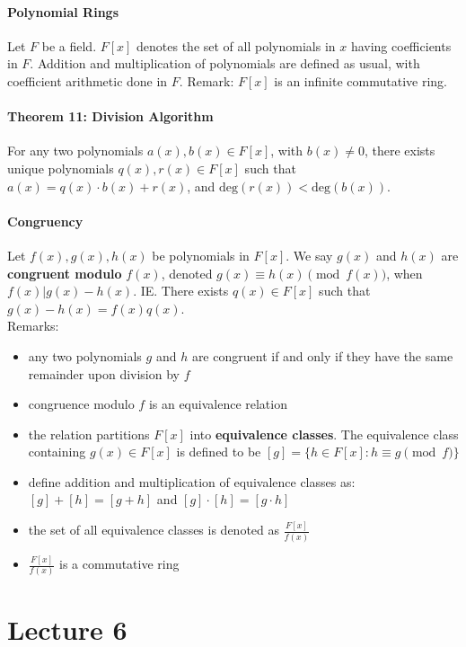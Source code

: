 \documentclass[10pt,letter]{article}
\theoremstyle{plain}
\theoremstyle{definition}
\begin{document}
\paragraph{Polynomial Rings}
Let $F$ be a field. $F[x]$ denotes the set of all polynomials in $x$ having coefficients in $F$. Addition and multiplication of polynomials are defined as usual, with coefficient arithmetic done in $F$. Remark: $F[x]$ is an infinite commutative ring.

\paragraph{Theorem 11: Division Algorithm}
For any two polynomials $a(x),b(x)\in F[x]$, with $b(x)\neq0$, there exists unique polynomials $q(x),r(x)\in F[x]$ such that $a(x)=q(x)\cdot b(x)+r(x)$, and $\text{deg}(r(x))<\text{deg}(b(x))$. \\ 


\paragraph{Congruency}
Let $f(x),g(x),h(x)$ be polynomials in $F[x]$. We say $g(x)$ and $h(x)$  are \textbf{congruent modulo} $f(x)$, denoted $g(x)\equiv h(x)\pmod{f(x)}$, when $f(x)|g(x)-h(x)$. IE. There exists $q(x)\in F[x]$ such that $g(x)-h(x)=f(x)q(x)$. \\ 
Remarks: 
\begin{itemize}
    \item any two polynomials $g$ and $h$ are congruent if and only if they have the same remainder upon division by $f$ 
    \item congruence modulo $f$ is an equivalence relation 
    \item the relation partitions $F[x]$ into \textbf{equivalence classes}. The equivalence class containing $g(x)\in F[x]$ is defined to be $[g]=\{h\in F[x]:h\equiv g\pmod{f}\}$ 
    \item define addition and multiplication of equivalence classes as: $[g]+[h]=[g+h]$ and $[g]\cdot[h]=[g\cdot h]$ 
    \item the set of all equivalence classes is denoted as $\frac{F[x]}{f(x)}$ 
    \item $\frac{F[x]}{f(x)}$ is a commutative ring
\end{itemize}

\section*{Lecture 6}
\end{document}
